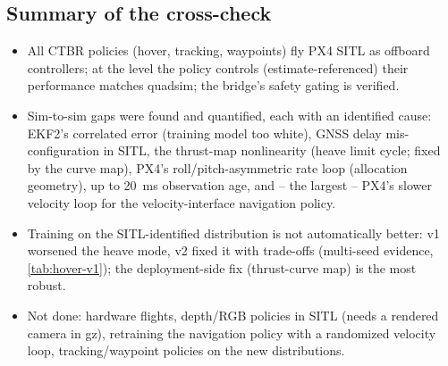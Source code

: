 \subsection{Summary of the cross-check}
\begin{itemize}
\item All CTBR policies (hover, tracking, waypoints) fly PX4 SITL as offboard controllers; at the level the policy
controls (estimate-referenced) their performance matches quadsim; the bridge's safety gating is verified.
\item Sim-to-sim gaps were found and quantified, each with an identified cause: EKF2's correlated error (training model too
white), GNSS delay mis-configuration in SITL, the thrust-map nonlinearity (heave limit cycle; fixed by the curve map),
PX4's roll/pitch-asymmetric rate loop (allocation geometry), up to \SI{20}{ms} observation age, and -- the
largest -- PX4's slower velocity loop for the velocity-interface navigation policy.
\item Training on the SITL-identified distribution is not automatically better: v1 worsened the heave mode, v2 fixed it
with trade-offs (multi-seed evidence, \cref{tab:hover-v1}); the deployment-side fix (thrust-curve map) is the most robust.
\item Not done: hardware flights, depth/RGB policies in SITL (needs a rendered camera in gz), retraining the
navigation policy with a randomized velocity loop, tracking/waypoint policies on the new distributions.
\end{itemize}

